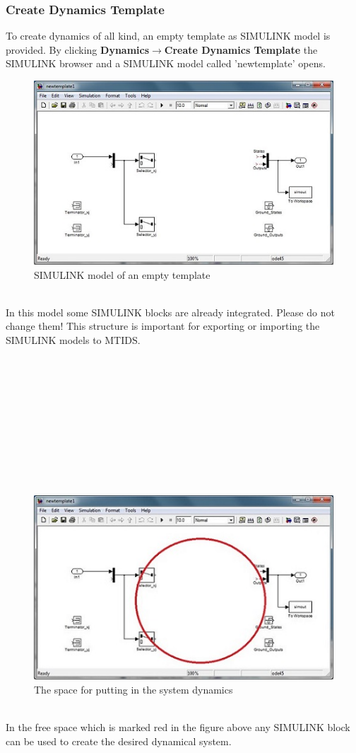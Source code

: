 \documentclass[12pt]{report}
\begin{document}
\subsubsection{Create Dynamics Template}
To create dynamics of all kind, an empty template as SIMULINK model is provided. By clicking \textbf{Dynamics$\rightarrow$Create Dynamics Template} the SIMULINK browser and a SIMULINK model called 'newtemplate' opens.\\
\begin{figure}[h]
\centering
\includegraphics[scale=.7]{template}
\caption{SIMULINK model of an empty template}
\label{FIG:abb11}
\end{figure}
\\
In this model some SIMULINK blocks are already integrated. Please do not change them! This structure is important for exporting or importing the SIMULINK models to MTIDS.\\
\\
\\
\\
\\
\\
\\
\\
\\
\\
\\
\begin{figure}[h]
\centering
\includegraphics[scale=.7]{template2}
\caption{The space for putting in the system dynamics}
\label{FIG:abb12}
\end{figure}
\\
In the free space which is marked red in the figure above any SIMULINK block can be used to create the desired dynamical system.\\
\\
\end{document}
